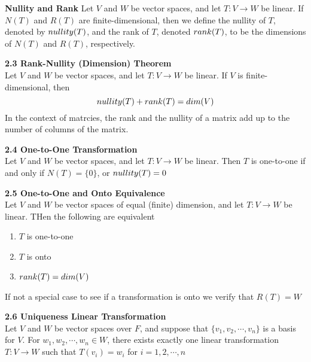 \documentclass[11pt]{article}
\begin{document}
\begin{defn*}
    \textbf{Nullity and Rank} Let $V$ and $W$ be vector spaces, and let $T:V\to W$ be linear. If $N(T)$ and $R(T)$ are finite-dimensional, then we define the nullity of $T$, denoted by $nullity(T)$, and the rank of $T$, denoted $rank(T)$, to be the dimensions of $N(T)$ and $R(T)$, respectively.
\end{defn*}


\begin{theorem*}
    \textbf{2.3 Rank-Nullity (Dimension) Theorem}\\ Let $V$ and $W$ be vector spaces, and let $T:V\to W$ be linear. If $V$ is finite-dimensional, then 
    \[
        nullity(T) + rank(T) = dim(V)
    \]
    In the context of matrcies, the rank and the nullity of a matrix add up to the number of columns of the matrix.
\end{theorem*}

\begin{theorem*}
    \textbf{2.4 One-to-One Transformation}\\
     Let $V$ and $W$ be vector spaces, and let $T:V\to W$ be linear. Then $T$ is one-to-one if and only if $N(T)=\{0\}$, or $nullity(T)=0$
\end{theorem*}

\begin{theorem*}
    \textbf{2.5 One-to-One and Onto Equivalence}\\
     Let $V$ and $W$ be vector spaces of equal (finite) dimension, and let $T:V\to W$ be linear. THen the following are equivalent
    \begin{enumerate}
        \item $T$ is one-to-one 
        \item $T$ is onto
        \item $rank(T)=dim(V)$
    \end{enumerate}
    If not a special case to see if a transformation is onto we verify that $R(T) = W$
\end{theorem*}


\begin{theorem*}
    \textbf{2.6 Uniqueness Linear Transformation} \\
    Let $V$ and $W$ be vector spaces over $F$, and suppose that $\{v_1,v_2,\cdots, v_n\}$ is a basis for $V$. For $w_1, w_2, \cdots, w_n\in W$, there exists exactly one linear transformation $T:V\to W$ such that $T(v_i) = w_i$ for $i=1,2,\cdots, n$
\end{theorem*}
\end{document}
